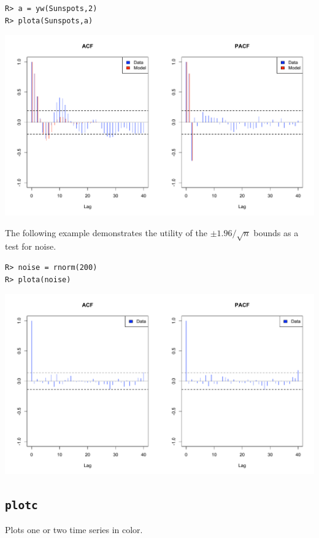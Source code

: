 \documentclass[11pt]{article}
\begin{document}
\begin{verbatim}
R> a = yw(Sunspots,2)
R> plota(Sunspots,a)
\end{verbatim}

\begin{center}
\includegraphics[scale=0.3]{Rplot-22.pdf}
\end{center}

\noindent
The following example demonstrates the utility of the $\pm1.96/\sqrt{n}$ bounds
as a test for noise.

\begin{verbatim}
R> noise = rnorm(200)
R> plota(noise)
\end{verbatim}

\begin{center}
\includegraphics[scale=0.3]{Rplot-8.pdf}
\end{center}

\newpage

\subsection{\tt plotc}
Plots one or two time series in color.
\end{document}
